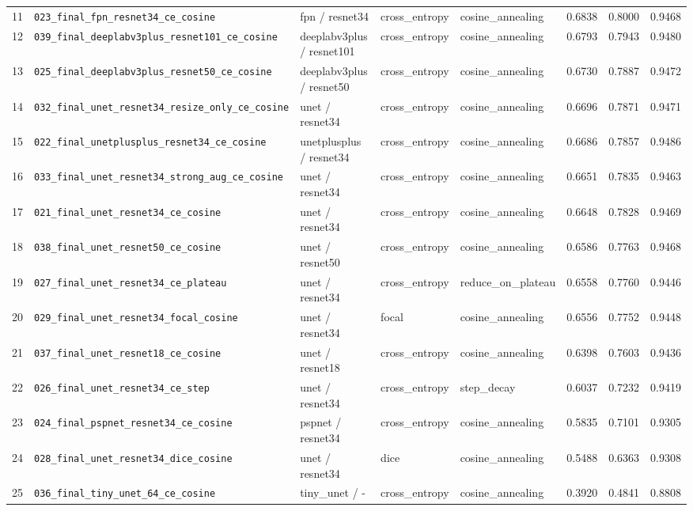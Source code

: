 \documentclass[12pt,a4paper]{article}
\begin{document}
\begin{landscape}
\begin{longtable}{r p{7.0cm} p{4.2cm} p{3.0cm} p{3.2cm} r r r}
11 & \texttt{023\_final\_fpn\_resnet34\_ce\_cosine} & fpn / resnet34 & cross\_entropy & cosine\_annealing & 0.6838 & 0.8000 & 0.9468 \\
12 & \texttt{039\_final\_deeplabv3plus\_resnet101\_ce\_cosine} & deeplabv3plus / resnet101 & cross\_entropy & cosine\_annealing & 0.6793 & 0.7943 & 0.9480 \\
13 & \texttt{025\_final\_deeplabv3plus\_resnet50\_ce\_cosine} & deeplabv3plus / resnet50 & cross\_entropy & cosine\_annealing & 0.6730 & 0.7887 & 0.9472 \\
14 & \texttt{032\_final\_unet\_resnet34\_resize\_only\_ce\_cosine} & unet / resnet34 & cross\_entropy & cosine\_annealing & 0.6696 & 0.7871 & 0.9471 \\
15 & \texttt{022\_final\_unetplusplus\_resnet34\_ce\_cosine} & unetplusplus / resnet34 & cross\_entropy & cosine\_annealing & 0.6686 & 0.7857 & 0.9486 \\
16 & \texttt{033\_final\_unet\_resnet34\_strong\_aug\_ce\_cosine} & unet / resnet34 & cross\_entropy & cosine\_annealing & 0.6651 & 0.7835 & 0.9463 \\
17 & \texttt{021\_final\_unet\_resnet34\_ce\_cosine} & unet / resnet34 & cross\_entropy & cosine\_annealing & 0.6648 & 0.7828 & 0.9469 \\
18 & \texttt{038\_final\_unet\_resnet50\_ce\_cosine} & unet / resnet50 & cross\_entropy & cosine\_annealing & 0.6586 & 0.7763 & 0.9468 \\
19 & \texttt{027\_final\_unet\_resnet34\_ce\_plateau} & unet / resnet34 & cross\_entropy & reduce\_on\_plateau & 0.6558 & 0.7760 & 0.9446 \\
20 & \texttt{029\_final\_unet\_resnet34\_focal\_cosine} & unet / resnet34 & focal & cosine\_annealing & 0.6556 & 0.7752 & 0.9448 \\
21 & \texttt{037\_final\_unet\_resnet18\_ce\_cosine} & unet / resnet18 & cross\_entropy & cosine\_annealing & 0.6398 & 0.7603 & 0.9436 \\
22 & \texttt{026\_final\_unet\_resnet34\_ce\_step} & unet / resnet34 & cross\_entropy & step\_decay & 0.6037 & 0.7232 & 0.9419 \\
23 & \texttt{024\_final\_pspnet\_resnet34\_ce\_cosine} & pspnet / resnet34 & cross\_entropy & cosine\_annealing & 0.5835 & 0.7101 & 0.9305 \\
24 & \texttt{028\_final\_unet\_resnet34\_dice\_cosine} & unet / resnet34 & dice & cosine\_annealing & 0.5488 & 0.6363 & 0.9308 \\
25 & \texttt{036\_final\_tiny\_unet\_64\_ce\_cosine} & tiny\_unet / - & cross\_entropy & cosine\_annealing & 0.3920 & 0.4841 & 0.8808 \\

\end{longtable}
\end{landscape}
\end{document}
